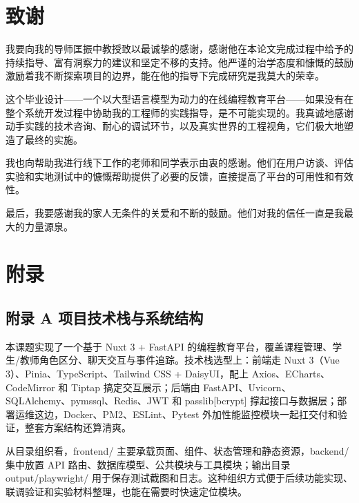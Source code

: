 \clearpage
{}
{}\label{ux53c2ux8003ux6587ux732e}
\nocite{*}



\chapter*{致谢}\label{ux81f4ux8c22}

我要向我的导师匡振中教授致以最诚挚的感谢，感谢他在本论文完成过程中给予的持续指导、富有洞察力的建议和坚定不移的支持。他严谨的治学态度和慷慨的鼓励激励着我不断探索项目的边界，能在他的指导下完成研究是我莫大的荣幸。

这个毕业设计——一个以大型语言模型为动力的在线编程教育平台——如果没有在整个系统开发过程中协助我的工程师的实践指导，是不可能实现的。我真诚地感谢动手实践的技术咨询、耐心的调试环节，以及真实世界的工程视角，它们极大地塑造了最终的实施。

我也向帮助我进行线下工作的老师和同学表示由衷的感谢。他们在用户访谈、评估实验和实地测试中的慷慨帮助提供了必要的反馈，直接提高了平台的可用性和有效性。

最后，我要感谢我的家人无条件的关爱和不断的鼓励。他们对我的信任一直是我最大的力量源泉。

\chapter*{附录}\label{ux9644ux5f55}

\section*{附录 A 项目技术栈与系统结构}\label{ux9644ux5f55-a-ux9879ux76eeux6280ux672fux6808ux4e0eux7cfbux7edfux7ed3ux6784}

本课题实现了一个基于 Nuxt 3 + FastAPI 的编程教育平台，覆盖课程管理、学生/教师角色区分、聊天交互与事件追踪。技术栈选型上：前端走 Nuxt 3（Vue 3）、Pinia、TypeScript、Tailwind CSS + DaisyUI，配上 Axios、ECharts、CodeMirror 和 Tiptap 搞定交互展示；后端由 FastAPI、Uvicorn、SQLAlchemy、pymssql、Redis、JWT 和 passlib[bcrypt] 撑起接口与数据层；部署运维这边，Docker、PM2、ESLint、Pytest 外加性能监控模块一起扛交付和验证，整套方案结构还算清爽。

从目录组织看，frontend/ 主要承载页面、组件、状态管理和静态资源，backend/ 集中放置 API 路由、数据库模型、公共模块与工具模块；输出目录 output/playwright/ 用于保存测试截图和日志。这种组织方式便于后续功能实现、联调验证和实验材料整理，也能在需要时快速定位模块。

